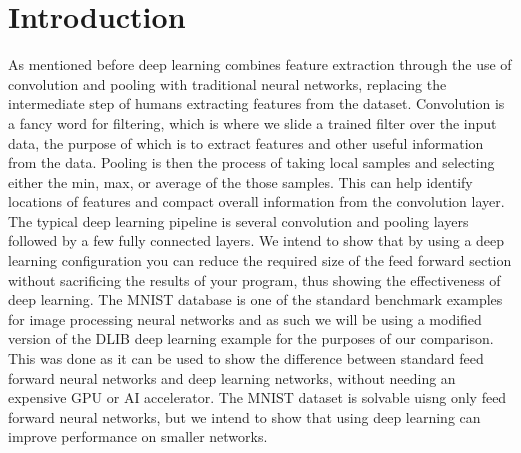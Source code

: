 \chapter{Introduction}
As mentioned before deep learning combines feature extraction through the use of convolution and pooling with traditional neural networks, replacing the intermediate step of humans extracting features from the dataset. Convolution is a fancy word for filtering, which is where we slide a trained filter over the input data, the purpose of which is to extract features and other useful information from the data. Pooling is then the process of taking local samples and selecting either the min, max, or average of the those samples. This can help identify locations of features and compact overall information from the convolution layer. The typical deep learning pipeline is several convolution and pooling layers followed by a few fully connected layers. We intend to show that by using a deep learning configuration you can reduce the required size of the feed forward section without sacrificing the results of your program, thus showing the effectiveness of deep learning. The MNIST database is one of the standard benchmark examples for image processing neural networks and as such we will be using a modified version of the DLIB deep learning example for the purposes of our comparison. This was done as it can be used to show the difference between standard feed forward neural networks and deep learning networks, without needing an expensive GPU or AI accelerator. The MNIST dataset is solvable uisng only feed forward neural networks, but we intend to show that using deep learning can improve performance on smaller networks. 